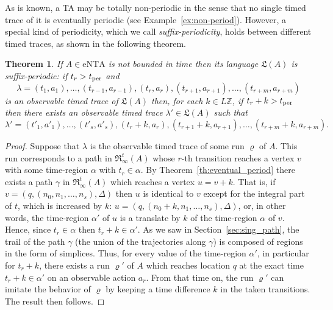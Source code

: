 \documentclass[11pt]{amsart}
\newtheorem{theorem}{Theorem}[section]
\theoremstyle{definition}
\newcommand{\LLL}{\mathfrak{L}}
\newcommand{\IARRR}{\mathfrak{R}_{\infty}^{t}}
\newcommand{\ntaeps}{\mathrm{eNTA}}
\newcommand{\Integers}{\mathbb{Z}}
\begin{document}
As is known, a TA may be totally non-periodic in the sense that no single timed trace of it is eventually periodic (see Example~\ref{ex:non-period}).
However, a special kind of periodicity, which we call \emph{suffix-periodicity}, holds between different timed traces, as shown in the following theorem.
\begin{theorem}
\label{th:lang_eventual_period}
If $A \in \ntaeps$ is not bounded in time then its language $\LLL(A)$ is suffix-periodic:
if $t_r > t_\textnormal{per}$ and
$$\lambda = (t_1, a_1),\ldots,  (t_{r-1}, a_{r-1}), (t_r, a_r), (t_{r+1}, a_{r+1}),\ldots, (t_{r+m}, a_{r+m})$$
is an observable timed trace of $\LLL(A)$ then, for each $k \in L\Integers$, if $t_r + k > t_\textnormal{per}$ then there exists an observable timed trace
$\lambda' \in \LLL(A)$ such that $$\lambda' = (t'_1, a'_1),\ldots,  (t'_s, a'_s), (t_{r}+k, a_r), (t_{r+1}+k, a_{r+1}),\ldots, (t_{r+m}+k, a_{r+m}).$$
\end{theorem}
\begin{proof}
Suppose that $\lambda$ is the observable timed trace of some run $\varrho$ of $A$.
This run corresponds to a path in $\IARRR(A)$ whose $r$-th transition reaches a vertex $v$ with some time-region $\alpha$ with $t_r \in \alpha$. 
By Theorem~\ref{th:eventual_period} there exists a path $\gamma$ in $\IARRR(A)$ which reaches a vertex $u=v+k$.
That is, if $v  = (q, (n_0, n_1, \ldots, n_s), \Delta)$ then $u$ is identical to $v$ except for the integral part of $t$, which is increased by $k$: 
$u =  (q, (n_0 + k, n_1, \ldots, n_s), \Delta)$, or, in other words, the time-region $\alpha'$ of $u$ is a translate by $k$ of the time-region $\alpha$ of $v$.
Hence, since $t_r \in \alpha$ then $t_r + k \in \alpha'$.
As we saw in Section~\ref{sec:sing_path}, the trail of the path $\gamma$ (the union of the trajectories along $\gamma$) is composed of regions in the form of simplices.
Thus, for every value of the time-region $\alpha'$, in particular for $t_r + k$,   there exists a run $\varrho'$ of $A$ which reaches location $q$ at the exact time $t_{r}+k \in \alpha'$ on an observable action $a_r$.
From that time on, the run $\varrho'$ can imitate the behavior of $\varrho$ by keeping a time difference $k$ in the taken transitions.
The result then follows.
\end{proof}
\end{document}
